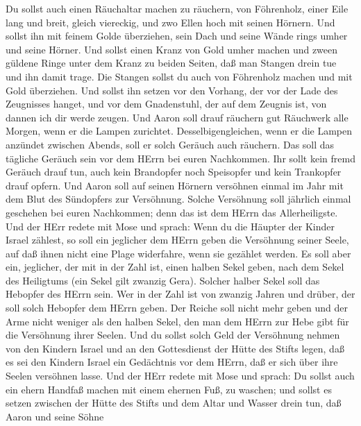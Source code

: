  Du sollst auch einen Räuchaltar machen zu räuchern, von
Föhrenholz,  einer Eile lang und breit, gleich viereckig,
und zwo Ellen hoch mit seinen Hörnern.  Und sollst ihn mit
feinem Golde überziehen, sein Dach und seine Wände rings umher und seine
Hörner. Und sollst einen Kranz von Gold umher machen  und
zween güldene Ringe unter dem Kranz zu beiden Seiten, daß man Stangen
drein tue und ihn damit trage.  Die Stangen sollst du auch
von Föhrenholz machen und mit Gold überziehen.  Und sollst
ihn setzen vor den Vorhang, der vor der Lade des Zeugnisses hanget, und
vor dem Gnadenstuhl, der auf dem Zeugnis ist, von dannen ich dir werde
zeugen.  Und Aaron soll drauf räuchern gut Räuchwerk alle
Morgen, wenn er die Lampen zurichtet.  Desselbigengleichen,
wenn er die Lampen anzündet zwischen Abends, soll er solch Geräuch auch
räuchern. Das soll das tägliche Geräuch sein vor dem HErrn bei euren
Nachkommen.  Ihr sollt kein fremd Geräuch drauf tun, auch
kein Brandopfer noch Speisopfer und kein Trankopfer drauf opfern.
 Und Aaron soll auf seinen Hörnern versöhnen einmal im Jahr
mit dem Blut des Sündopfers zur Versöhnung. Solche Versöhnung soll
jährlich einmal geschehen bei euren Nachkommen; denn das ist dem HErrn
das Allerheiligste.  Und der HErr redete mit Mose und
sprach:  Wenn du die Häupter der Kinder Israel zählest, so
soll ein jeglicher dem HErrn geben die Versöhnung seiner Seele, auf daß
ihnen nicht eine Plage widerfahre, wenn sie gezählet werden.
 Es soll aber ein, jeglicher, der mit in der Zahl ist,
einen halben Sekel geben, nach dem Sekel des Heiligtums (ein Sekel gilt
zwanzig Gera). Solcher halber Sekel soll das Hebopfer des HErrn sein.
 Wer in der Zahl ist von zwanzig Jahren und drüber, der
soll solch Hebopfer dem HErrn geben.  Der Reiche soll nicht
mehr geben und der Arme nicht weniger als den halben Sekel, den man dem
HErrn zur Hebe gibt für die Versöhnung ihrer Seelen.  Und
du sollst solch Geld der Versöhnung nehmen von den Kindern Israel und an
den Gottesdienst der Hütte des Stifts legen, daß es sei den Kindern
Israel ein Gedächtnis vor dem HErrn, daß er sich über ihre Seelen
versöhnen lasse.  Und der HErr redete mit Mose und sprach:
 Du sollst auch ein ehern Handfaß machen mit einem ehernen
Fuß, zu waschen; und sollst es setzen zwischen der Hütte des Stifts und
dem Altar und Wasser drein tun,  daß Aaron und seine Söhne

